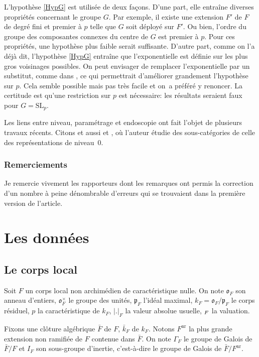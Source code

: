 \documentclass[JEP,XML,SOM,Unicode,francais]{cedram}
\newcommand{\NoChangel}[1]{%
\expandafter\let\csname old\string#1\endcsname=#1
\let#1=\relax
\newcommand{#1}{\mathcode`l="716C\csname old\string#1\endcsname\mathcode`l="7160 }%
}
\let\oldS\S
\renewcommand{\S}{\oldS\,}
\newcommand{\fro}{\mathfrak{o}}
\newcommand{\frp}{\mathfrak{p}}
\newcommand{\nr}{\mathrm{nr}}
\DeclareMathOperator{\val}{val} \NoChangel{\val}
\theoremstyle{plain}
\theoremstyle{definition}
\begin{document}
L'hypothèse \ref{HypG} est utilisée de deux façons. D'une part, elle entraîne diverses propriétés concernant le groupe $G$. Par exemple, il existe une extension $F'$ de $F$ de degré fini et premier à $p$ telle que $G$ soit déployé sur $F'$. Ou bien, l'ordre du groupe des composantes connexes du centre de $G$ est premier à $p$. Pour ces propriétés, une hypothèse plus faible serait suffisante. D'autre part, comme on l'a déjà dit, l'hypothèse \ref{HypG} entraîne que l'exponentielle est définie sur les plus gros voisinages possibles. On peut envisager de remplacer l'exponentielle par un substitut, comme dans \cite[\S1.8]{KV}, ce qui permettrait d'améliorer grandement l'hypothèse sur $p$. Cela semble possible mais pas très facile et on~a préféré y renoncer. La certitude est qu'une restriction sur $p$ est nécessaire: les résultats seraient faux pour $G=\mathrm{SL}_{p}$.

Les liens entre niveau, paramétrage et endoscopie ont fait l'objet de plusieurs travaux récents. Citons \cite{Oi} et aussi \cite{Lanard1} et \cite{Lanard2}, où l'auteur étudie des sous-catégories de celle des représentations de niveau~$0$.

\subsubsection*{Remerciements}
Je remercie vivement les rapporteurs dont les remarques ont permis la correction d'un nombre à peine dénombrable d'erreurs qui se trouvaient dans la première version de l'article.

\section{Les données}

\subsection{Le corps local}

Soit $F$ un corps local non archimédien de caractéristique nulle. On note $\fro_{F}$ son anneau d'entiers, $\fro_{F}^{\times}$ le groupe des unités, $ \frp_{F}$ l'idéal maximal, $k_{F}=\fro_{F}/\frp_{F}$ le corps résiduel, $p$ la caractéristique de $k_{F}$, $\vert .\vert _{F}$ la valeur absolue usuelle, $\val_{F}$ la valuation.

Fixons une clôture algébrique $\bar{F}$ de $F$, \resp $\bar{k}_{F}$ de $k_{F}$. Notons $F^{\nr}$ la plus grande extension non ramifiée de $F$ contenue dans $\bar{F}$. On note $\Gamma_{F}$ le groupe de Galois de $\bar{F}/ F$ et $I_{F}$ son sous-groupe d'inertie, c'est-à-dire le groupe de Galois de $\bar{F}/F^{\nr}$.
\end{document}
